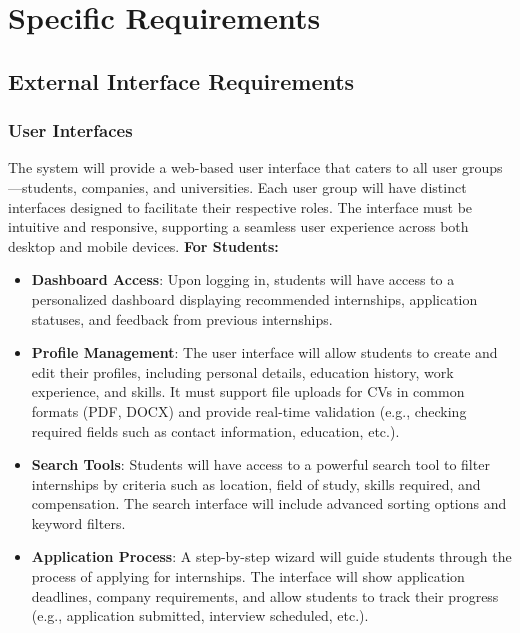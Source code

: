 \section{Specific Requirements}

\subsection{External Interface Requirements}

\subsubsection{User Interfaces}

The system will provide a web-based user interface that caters to all user groups—students, companies, and universities. Each user group will have distinct interfaces designed to facilitate their respective roles. The interface must be intuitive and responsive, supporting a seamless user experience across both desktop and mobile devices.
\vspace{5mm}
\textbf{For Students:}
\begin{itemize}
    \item \textbf{Dashboard Access}: Upon logging in, students will have access to a personalized dashboard displaying recommended internships, application statuses, and feedback from previous internships.
    \item \textbf{Profile Management}: The user interface will allow students to create and edit their profiles, including personal details, education history, work experience, and skills. It must support file uploads for CVs in common formats (PDF, DOCX) and provide real-time validation (e.g., checking required fields such as contact information, education, etc.).
    \item \textbf{Search Tools}: Students will have access to a powerful search tool to filter internships by criteria such as location, field of study, skills required, and compensation. The search interface will include advanced sorting options and keyword filters.
    \item \textbf{Application Process}: A step-by-step wizard will guide students through the process of applying for internships. The interface will show application deadlines, company requirements, and allow students to track their progress (e.g., application submitted, interview scheduled, etc.).
\end{itemize}
\vspace{5mm}
